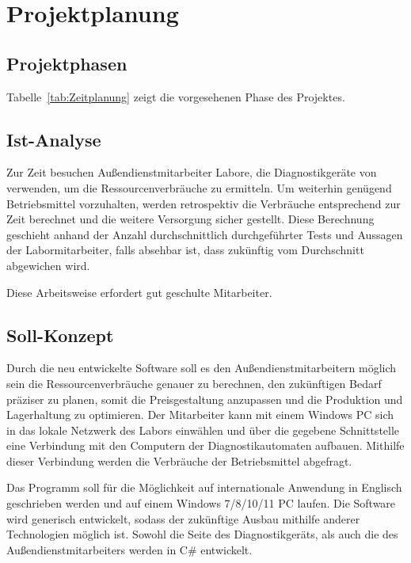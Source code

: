 \section{Projektplanung}
\label{sec:Projektplanung}

\subsection{Projektphasen} 
\label{sec:Projektphasen}

Tabelle~\ref{tab:Zeitplanung} zeigt die vorgesehenen Phase des Projektes.
\\ 

\subsection{Ist-Analyse} 
\label{sec:IstAnalyse}
Zur Zeit besuchen Außendienstmitarbeiter Labore, die Diagnostikgeräte von {\betriebNameKzf} verwenden, um die Ressourcenverbräuche zu ermitteln. Um weiterhin genügend Betriebsmittel vorzuhalten, werden retrospektiv die Verbräuche entsprechend zur Zeit berechnet und die weitere Versorgung sicher gestellt. Diese Berechnung geschieht anhand der Anzahl durchschnittlich durchgeführter Tests und Aussagen der Labormitarbeiter, falls absehbar ist, dass zukünftig vom Durchschnitt abgewichen wird.

Diese Arbeitsweise erfordert gut geschulte Mitarbeiter.

\subsection{Soll-Konzept}
\label{sec:SollKonzept}
Durch die neu entwickelte Software soll es den Außendienstmitarbeitern möglich sein die Ressourcenverbräuche genauer zu berechnen, den zukünftigen Bedarf präziser zu planen, somit die Preisgestaltung anzupassen und die Produktion und Lagerhaltung zu optimieren. Der Mitarbeiter kann mit einem Windows PC sich in das lokale Netzwerk des Labors einwählen und über die gegebene Schnittstelle eine Verbindung mit den Computern der Diagnostikautomaten aufbauen. Mithilfe dieser Verbindung werden die Verbräuche der Betriebsmittel abgefragt.

Das Programm soll für die Möglichkeit auf internationale Anwendung in Englisch geschrieben werden und auf einem Windows 7/8/10/11 PC laufen. Die Software wird generisch entwickelt, sodass der zukünftige Ausbau mithilfe anderer Technologien möglich ist. Sowohl die Seite des Diagnostikgeräts, als auch die des Außendienstmitarbeiters werden in C\# entwickelt.

